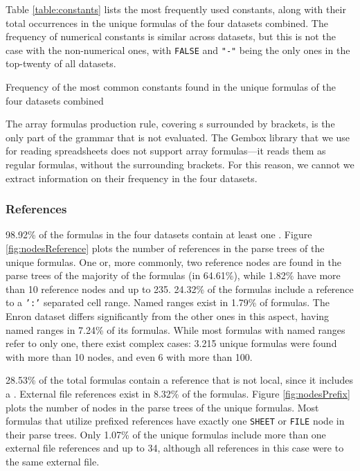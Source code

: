 \documentclass[times]{smrauth}
\begin{document}
Table \ref{table:constants} lists the most frequently used constants, along with their total occurrences in the unique formulas of the four datasets combined. The frequency of numerical constants is similar across datasets, but this is not the case with the non-numerical ones, with \texttt{FALSE} and \texttt{"-"} being the only ones in the top-twenty of all datasets.

\begin{table}[]
	\centering
	\caption{Frequency of the most common constants found in the unique formulas of the four datasets combined}
	\label{table:constants}
	
\end{table}

The array formulas production rule, covering s surrounded by brackets, is the only part of the grammar that is not evaluated. The Gembox library that we use for reading spreadsheets does not support array formulas---it reads them as regular formulas, without the surrounding brackets. For this reason, we cannot we extract information on their frequency in the four datasets.

\subsubsection{References}

98.92\% of the formulas in the four datasets contain at least one . Figure \ref{fig:nodesReference} plots the number of references in the parse trees of the unique formulas. One or, more commonly, two reference nodes are found in the parse trees of the majority of the formulas (in 64.61\%), while 1.82\% have more than 10 reference nodes and up to 235. 24.32\% of the formulas include a reference to a \texttt{':'} separated cell range. Named ranges exist in 1.79\% of formulas. The Enron dataset differs significantly from the other ones in this aspect, having named ranges in 7.24\% of its formulas. While most formulas with named ranges refer to only one, there exist complex cases: 3.215  unique formulas were found with more than 10  nodes, and even 6 with more than 100.

28.53\% of the total formulas contain a reference that is not local, since it includes a . External file references exist in 8.32\% of the formulas.  Figure \ref{fig:nodesPrefix} plots the number of  nodes in the parse trees of the unique formulas. Most formulas that utilize prefixed references have exactly one \texttt{SHEET} or \texttt{FILE} node in their parse trees. Only 1.07\% of the unique formulas include more than one external file references and up to 34, although all references in this case were to the same external file.
\end{document}
